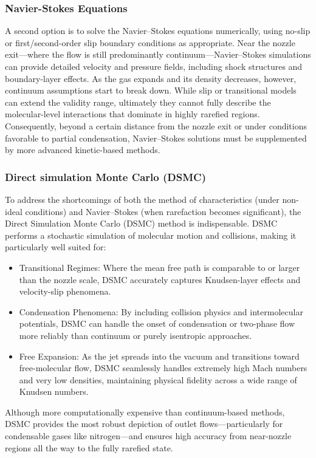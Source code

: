 \subsubsection*{Navier-Stokes Equations}
	A second option is to solve the Navier–Stokes equations numerically, using no-slip or first/second-order slip boundary conditions as appropriate.
	Near the nozzle exit—where the flow is still predominantly continuum—Navier–Stokes simulations can provide detailed velocity and pressure fields, including shock structures and boundary-layer effects.
	As the gas expands and its density decreases, however, continuum assumptions start to break down.
	While slip or transitional models can extend the validity range, ultimately they cannot fully describe the molecular-level interactions that dominate in highly rarefied regions.
	Consequently, beyond a certain distance from the nozzle exit or under conditions favorable to partial condensation, Navier–Stokes solutions must be supplemented by more advanced kinetic-based methods.
	\cite{anderson_fundamentals_2017, anderson2021modern}

\subsubsection*{Direct simulation Monte Carlo (DSMC)}
	To address the shortcomings of both the method of characteristics (under non-ideal conditions) and Navier–Stokes (when rarefaction becomes significant), the Direct Simulation Monte Carlo (DSMC) method is indispensable.
	DSMC performs a stochastic simulation of molecular motion and collisions, making it particularly well suited for:
	\begin{itemize}
		\item Transitional Regimes: Where the mean free path is comparable to or larger than the nozzle scale, DSMC accurately captures Knudsen-layer effects and velocity-slip phenomena.
		\item Condensation Phenomena: By including collision physics and intermolecular potentials, DSMC can handle the onset of condensation or two-phase flow more reliably than continuum or purely isentropic approaches. \cite{EMMONS1958}
		\item Free Expansion: As the jet spreads into the vacuum and transitions toward free-molecular flow, DSMC seamlessly handles extremely high Mach numbers and very low densities, maintaining physical fidelity across a wide range of Knudsen numbers.
	\end{itemize}
	Although more computationally expensive than continuum-based methods, DSMC provides the most robust depiction of outlet flows—particularly for condensable gases like nitrogen—and ensures high accuracy from near-nozzle regions all the way to the fully rarefied state.
	\cite{putignano2012supersonic, liu_study_2006}
	\newpage
